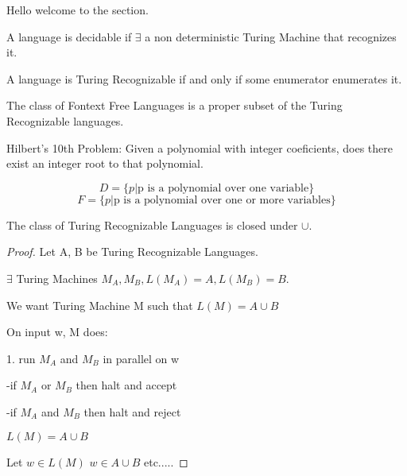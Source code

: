 
Hello welcome to the section.

\begin{corollary}
    A language is decidable if $\exists$ a non deterministic Turing Machine that recognizes it.
\end{corollary}

\begin{theorem}
    A language is Turing Recognizable if and only if some enumerator enumerates it.
\end{theorem}

\begin{theorem}
    The class of Fontext Free Languages is a proper subset of the Turing Recognizable languages.
\end{theorem}

Hilbert's 10th Problem: Given a polynomial with integer coeficients, does there exist an integer root to that polynomial.

\[D = \{p|\text{p is a polynomial over one variable}\}  \]
\[F = \{p|\text{p is a polynomial over one or more variables}\}  \]

\begin{theorem}
The class of Turing Recognizable Languages is closed under $\cup$.
\end{theorem}

\begin{proof}
Let A, B be Turing Recognizable Languages.

$\exists$ Turing Machines $M_A, M_B, L(M_A)=A, L(M_B)=B$.

We want Turing Machine M such that $L(M)=A\cup B$

On input w, M does:

1. run $M_A$ and $M_B$ in parallel on w

    -if $M_A$ or $M_B$ then halt and accept
    
    -if $M_A$ and $M_B$ then halt and reject

\begin{claim}
$L(M)=A\cup B$
\end{claim}
Let $w\in L(M)$
$w\in A\cup B$ etc.....
\end{proof}
